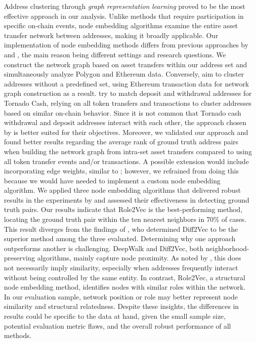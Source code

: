 \documentclass[12pt,a4paper,titlepage,oneside,english]{article}
\begin{document}
Address clustering through \textit{graph representation learning} proved to be the most effective approach in our analysis. Unlike methods that require participation in specific on-chain events, node embedding algorithms examine the entire asset transfer network between addresses, making it broadly applicable. \newline
Our implementation of node embedding methods differs from previous approaches by \cite{Beres2020} and \cite{wu2022tutela}, the main reason being different settings and research questions. We construct the network graph based on asset transfers within our address set and simultaneously analyze Polygon and Ethereum data. \newline
Conversely, \cite{wu2022tutela} aim to cluster addresses without a predefined set, using Ethereum transaction data for network graph construction as a result. \cite{Beres2020} try to match deposit and withdrawal addresses for Tornado Cash, relying on all token transfers and transactions to cluster addresses based on similar on-chain behavior. Since it is not common that Tornado cash withdrawal and deposit addresses interact with each other, the approach chosen by \cite{Beres2020} is better suited for their objectives. \newline
Moreover, we validated our approach and found better results regarding the average rank of ground truth address pairs when building the network graph from intra-set asset transfers compared to using all token transfer events and/or transactions. A possible extension would include incorporating edge weights, similar to \cite{wu2022tutela}; however, we refrained from doing this because we would have needed to implement a custom node embedding algorithm.\newline
We applied three node embedding algorithms that delivered robust results in the experiments by \cite{Beres2020} and assessed their effectiveness in detecting ground truth pairs. Our results indicate that Role2Vec is the best-performing method, locating the ground truth pair within the ten nearest neighbors in 70\% of cases.  This result diverges from the findings of \cite{Beres2020}, who determined Diff2Vec to be the superior method among the three evaluated. \newline
Determining why one approach outperforms another is challenging. DeepWalk and Diff2Vec, both neighborhood-preserving algorithms, mainly capture node proximity. As noted by \cite{ahmed2018roletovec}, this does not necessarily imply similarity, especially when addresses frequently interact without being controlled by the same entity. In contrast, Role2Vec, a structural node embedding method, identifies nodes with similar roles within the network. In our evaluation sample, network position or role may better represent node similarity and structural relatedness. Despite these insights, the differences in results could be specific to the data at hand, given the small sample size, potential evaluation metric flaws, and the overall robust performance of all methods. \newline 
\end{document}
